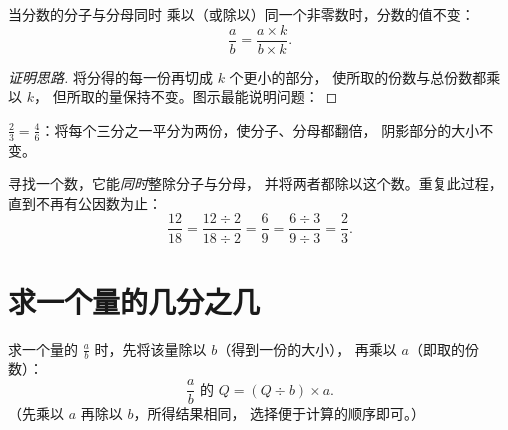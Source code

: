 \begin{proposition}[等值分数]\label{prop:g6:fractions:equal}
当分数的分子与分母同时
乘以（或除以）同一个非零数时，分数的值不变：
\[
\frac{a}{b} = \frac{a \times k}{b \times k} .
\]
\end{proposition}

\begin{proof}[证明思路]
将分得的每一份再切成 $k$ 个更小的部分，
使所取的份数与总份数都乘以 $k$，
但所取的量保持不变。图示最能说明问题：
\end{proof}

\begin{omfigure}

{\small $\frac23 = \frac46$：将每个三分之一平分为两份，使分子、分母都翻倍，
阴影部分的大小不变。}
\end{omfigure}

\begin{method}[约分]\label{met:g6:fractions:simplify}
寻找一个数，它能\emph{同时}整除分子与分母，
并将两者都除以这个数。重复此过程，直到不再有公因数为止：
\[
\frac{12}{18} = \frac{12 \div 2}{18 \div 2} = \frac{6}{9}
= \frac{6 \div 3}{9 \div 3} = \frac{2}{3}.
\]
\end{method}

\section{求一个量的几分之几}

\begin{method}[求一个量的几分之几]\label{met:g6:fractions:ofquantity}
求一个量的 $\frac ab$ 时，先将该量除以 $b$（得到一份的大小），
再乘以 $a$（即取的份数）：
\[
\frac ab \text{ 的 } Q = (Q \div b) \times a .
\]
（先乘以 $a$ 再除以 $b$，所得结果相同，
选择便于计算的顺序即可。）
\end{method}

